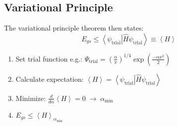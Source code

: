 \subsection{Variational Principle}
The variational principle theorem then states:
\begin{equation*}
    E_{gs}\leq\left\langle\psi_{\mathrm{trial}}\right|\widehat{H} \psi_{\mathrm{trial}}\left.\right\rangle \equiv \left<H\right>
\end{equation*}

\begin{enumerate}
    \item Set trial function e.g.: $\Psi_{\mathrm{trial}}={\left(\frac{\alpha}{\pi}\right)}^{1/4}\exp\left(\frac{-\alpha x^{2}}{2}\right)$
    \item Calculate expectation: $\left\langle H\right\rangle= \left\langle\psi_{\mathrm{trial}}\right|\widehat{H} \psi_{\mathrm{trial}}\left.\right\rangle$
    \item Minimize: $\frac{d}{d \alpha} \left\langle H\right\rangle=0\;\to\; \alpha_{\min}$ 
    \item $E_{gs}\leq {\left\langle H \right\rangle}_{\alpha_{\min}}$
\end{enumerate}